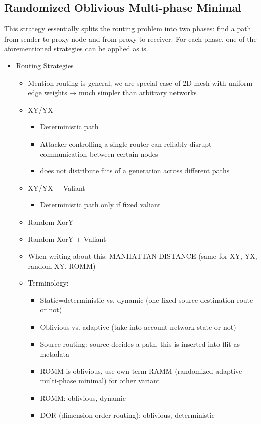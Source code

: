 \subsection{Randomized Oblivious Multi-phase Minimal}
This strategy essentially splits the routing problem into two phases: find a path from sender to proxy node and from proxy to receiver. For each
phase, one of the aforementioned strategies can be applied as is.

\begin{itemize}
    \item Routing Strategies
        \begin{itemize}
            \item Mention routing is general, we are special case of 2D mesh with uniform edge weights → much simpler than arbitrary networks
            \item XY/YX
                \begin{itemize}
                    \item Deterministic path
                    \item Attacker controlling a single router can reliably disrupt communication between certain nodes
                    \item does not distribute flits of a generation across different paths
                \end{itemize}
            \item XY/YX + Valiant
                \begin{itemize}
                    \item Deterministic path only if fixed valiant
                \end{itemize}
            \item Random XorY
            \item Random XorY + Valiant
            \item When writing about this: MANHATTAN DISTANCE (same for XY, YX, random XY, ROMM)
            \item Terminology:
                \begin{itemize}
                    \item Static=deterministic vs. dynamic (one fixed source-destination route or not)
                    \item Oblivious vs. adaptive (take into account network state or not)
                    \item Source routing: source decides a path, this is inserted into flit as metadata
                    \item ROMM is oblivious, use own term RAMM (randomized adaptive multi-phase minimal) for other variant
                    \item ROMM: oblivious, dynamic
                    \item DOR (dimension order routing): oblivious, deterministic
                \end{itemize}
        \end{itemize}
\end{itemize}

